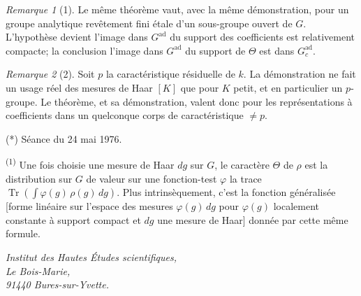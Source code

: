 \documentclass[10pt,a4paper]{amsart}
\theoremstyle{plain}
\theoremstyle{remark}
\newtheorem*{remarque}{Remarque}
\DeclareMathOperator{\Tr}{Tr}
\begin{document}
\begin{remarque}[1]
Le même théorème vaut, avec la même démonstration, pour un groupe analytique
revêtement fini étale d'un sous-groupe ouvert de $G$. L'hypothèse devient
\guillemotleft l'image dans $G^{\mathrm{ad}}$ du support des coefficients est relativement compacte\guillemotright;
la conclusion \guillemotleft l'image dans $G^{\mathrm{ad}}$ du support de $\Theta$ est dans $G_c^{\mathrm{ad}}$\guillemotright.
\end{remarque}

\begin{remarque}[2]
Soit $p$ la caractéristique résiduelle de $k$. La démonstration ne fait un usage réel des
mesures de Haar $[K]$ que pour $K$ petit, et en particulier un $p$-groupe. Le théorème,
et sa démonstration, valent donc pour les représentations à coefficients dans un
quelconque corps de caractéristique $\ne p$.
\end{remarque}

\vspace{2ex}

\noindent(*) Séance du 24 mai 1976.

\vspace{1ex}

\noindent\textsuperscript{(1)} Une fois choisie une mesure de Haar $dg$ sur $G$, le caractère $\Theta$ de $\rho$
est la distribution sur $G$ de valeur sur une fonction-test $\varphi$ la trace
$\Tr\left(\int \varphi(g)\, \rho(g)\, dg\right)$. Plus intrinsèquement, c'est la fonction généralisée
[forme linéaire sur l'espace des mesures $\varphi(g)\, dg$ pour $\varphi(g)$ localement constante
à support compact et $dg$ une mesure de Haar] donnée par cette même formule.

\vspace{2ex}

\begin{flushright}
\textit{Institut des Hautes Études scientifiques,\\
Le Bois-Marie,\\
91440 Bures-sur-Yvette.}
\end{flushright}
\end{document}
